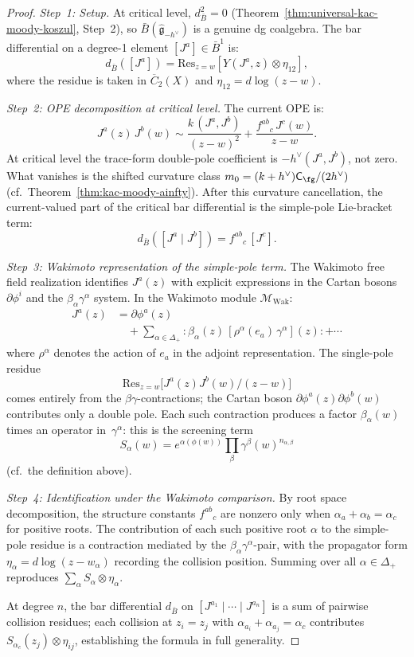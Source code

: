 \begin{proof}
\emph{Step~1: Setup.}
At critical level, $d_{\bar{B}}^2 = 0$ (Theorem~\ref{thm:universal-kac-moody-koszul}, Step~2), so $\bar{B}(\widehat{\mathfrak{g}}_{-h^\vee})$ is a genuine dg coalgebra. The bar differential on a degree-1 element $[J^a] \in \bar{B}^1$ is:
\[
d_{\bar{B}}([J^a]) = \mathrm{Res}_{z=w}\left[Y(J^a,z) \otimes \eta_{12}\right],
\]
where the residue is taken in $\overline{C}_2(X)$ and $\eta_{12} = d\log(z-w)$.

\emph{Step~2: OPE decomposition at critical level.}
The current OPE is:
\[
J^a(z)\,J^b(w) \sim \frac{k\,(J^a,J^b)}{(z-w)^2} + \frac{f^{ab}{}_c\,J^c(w)}{z-w}.
\]
At critical level the trace-form double-pole coefficient is
\(-h^\vee(J^a,J^b)\), not zero. What vanishes is the shifted curvature
class
\(m_0=(k+h^\vee)\mathsf C_{\fg}/(2h^\vee)\)
(cf.\ Theorem~\ref{thm:kac-moody-ainfty}). After this curvature
cancellation, the current-valued part of the critical bar differential
is the simple-pole Lie-bracket term:
\[
d_{\bar{B}}([J^a \mid J^b]) = f^{ab}{}_c\,[J^c].
\]

\emph{Step~3: Wakimoto representation of the simple-pole term.}
The Wakimoto free field realization \cite{Wakimoto86} identifies $J^a(z)$ with explicit expressions in the Cartan bosons $\partial\phi^i$ and the $\beta_\alpha\gamma^\alpha$ system. In the Wakimoto module $\mathcal{M}_{\mathrm{Wak}}$:
\begin{align*}
J^a(z) &= \partial\phi^a(z) \\
 &\quad + \sum_{\alpha \in \Delta_+}
 :\!\beta_\alpha(z)\,[\rho^\alpha(e_a)\,\gamma^\alpha](z)\!:
 + \cdots
\end{align*}
where $\rho^\alpha$ denotes the action of $e_a$ in the adjoint
representation. The single-pole residue
\[
\mathrm{Res}_{z=w}\bigl[J^a(z)J^b(w)/(z-w)\bigr]
\]
comes entirely from the $\beta\gamma$-contractions; the Cartan boson
$\partial\phi^a(z)\partial\phi^b(w)$ contributes only a double pole.
Each such contraction produces a factor $\beta_\alpha(w)$ times an
operator in~$\gamma^\alpha$: this is the screening term
\[
S_\alpha(w) = e^{\alpha(\phi(w))}\prod_\beta \gamma^\beta(w)^{n_{\alpha,\beta}}
\]
(cf.\ the definition above).

\emph{Step~4: Identification under the Wakimoto comparison.}
By root space decomposition, the structure constants $f^{ab}{}_c$ are nonzero only when $\alpha_a + \alpha_b = \alpha_c$ for positive roots. The contribution of each such positive root $\alpha$ to the simple-pole residue is a contraction mediated by the $\beta_\alpha\gamma^\alpha$-pair, with the propagator form $\eta_\alpha = d\log(z - w_\alpha)$ recording the collision position. Summing over all $\alpha \in \Delta_+$ reproduces $\sum_\alpha S_\alpha \otimes \eta_\alpha$.

At degree $n$, the bar differential $d_{\bar{B}}$ on $[J^{a_1} \mid \cdots \mid J^{a_n}]$ is a sum of pairwise collision residues; each collision at $z_i = z_j$ with $\alpha_{a_i} + \alpha_{a_j} = \alpha_c$ contributes $S_{\alpha_c}(z_j)\otimes\eta_{ij}$, establishing the formula in full generality.
\end{proof}

